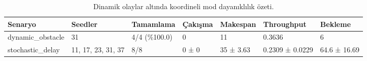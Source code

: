 \begin{table}[t]
\centering
\small
\begin{tabular}{lllllll}
\hline
Senaryo & Seedler & Tamamlama & Çakışma & Makespan & Throughput & Bekleme \\
\hline
dynamic\_obstacle & 31 & 4/4 (\%100.0) & 0 & 11 & 0.3636 & 6 \\
stochastic\_delay & 11, 17, 23, 31, 37 & 8/8 & 0 ± 0 & 35 ± 3.63 & 0.2309 ± 0.0229 & 64.6 ± 16.69 \\
\hline
\end{tabular}
\caption{Dinamik olaylar altında koordineli mod dayanıklılık özeti.}
\label{tab:robustness}
\end{table}
